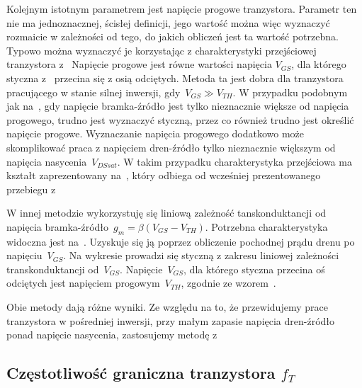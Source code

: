 \documentclass[twoside,pl,final]{labman}
\begin{document}
Kolejnym istotnym parametrem jest napięcie progowe tranzystora.
Parametr ten nie ma jednoznacznej, ścisłej definicji,
jego wartość można więc wyznaczyć rozmaicie w zależności od tego,
do jakich obliczeń jest ta wartość potrzebna.
Typowo można wyznaczyć je korzystając z charakterystyki przejściowej
tranzystora z~
Napięcie progowe jest równe wartości napięcia $V_{GS}$,
dla którego styczna z~ przecina się z osią odciętych.
Metoda ta jest dobra dla tranzystora pracującego w stanie silnej inwersji,
gdy~$V_{GS} \gg V_{TH}$.
W przypadku podobnym jak na~,
gdy napięcie bramka-źródło jest tylko nieznacznie większe od napięcia progowego,
trudno jest wyznaczyć styczną,
przez co również trudno jest określić napięcie progowe.
Wyznaczanie napięcia progowego dodatkowo może skomplikować praca z napięciem
dren-źródło tylko nieznacznie większym od napięcia nasycenia~$V_{DSsat}$.
W takim przypadku charakterystyka przejściowa ma kształt zaprezentowany na~,
który odbiega od wcześniej prezentowanego przebiegu z~

W innej metodzie wykorzystuję się liniową zależność tanskonduktancji
od napięcia bramka-źródło~$g_m = \beta( V_{GS} - V_{TH})$.
Potrzebna charakterystyka widoczna jest na~.
Uzyskuje się ją poprzez obliczenie pochodnej prądu drenu po napięciu~$V_{GS}$.
Na wykresie prowadzi się styczną z zakresu
liniowej zależności transkonduktancji od~$V_{GS}$.
Napięcie~$V_{GS}$, dla którego styczna przecina oś odciętych
jest napięciem progowym~$V_{TH}$, zgodnie ze wzorem~.

Obie metody dają różne wyniki.
Ze względu na to, że przewidujemy prace tranzystora w pośredniej inwersji,
przy małym zapasie napięcia dren-źródło ponad napięcie nasycenia,
zastosujemy metodę z~

\FloatBarrier
\subsection{Częstotliwość graniczna tranzystora $f_T$}
\label{model:squarelaw:ft}
\end{document}
